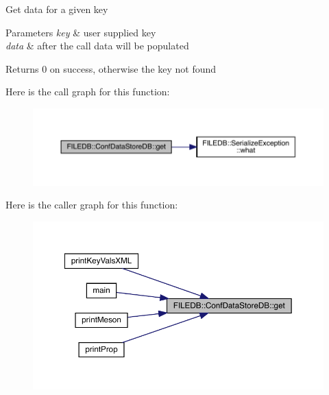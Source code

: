 Get data for a given key 
\begin{DoxyParams}{Parameters}
{\em key} & user supplied key \\
\hline
{\em data} & after the call data will be populated \\
\hline
\end{DoxyParams}
\begin{DoxyReturn}{Returns}
0 on success, otherwise the key not found 
\end{DoxyReturn}
Here is the call graph for this function\+:
\nopagebreak
\begin{figure}[H]
\begin{center}
\leavevmode
\includegraphics[width=350pt]{d8/d19/classFILEDB_1_1ConfDataStoreDB_ad89d0c1aef7c82fb0273d50bfea7cf0a_cgraph}
\end{center}
\end{figure}
Here is the caller graph for this function\+:
\nopagebreak
\begin{figure}[H]
\begin{center}
\leavevmode
\includegraphics[width=350pt]{d8/d19/classFILEDB_1_1ConfDataStoreDB_ad89d0c1aef7c82fb0273d50bfea7cf0a_icgraph}
\end{center}
\end{figure}
\mbox{\label{classFILEDB_1_1ConfDataStoreDB_ad89d0c1aef7c82fb0273d50bfea7cf0a}} 
